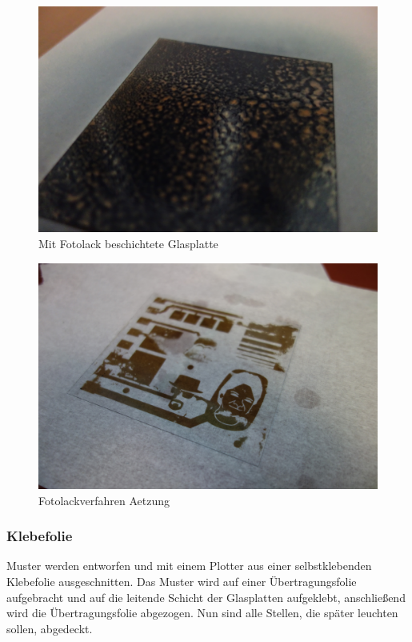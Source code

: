 \begin{figure}[t]
  \centering
  \includegraphics[width=\linewidth, keepaspectratio]{Bilder/Fotolackverfahrenbeschichtet}
  \caption{Mit Fotolack beschichtete Glasplatte}
  \label{Fotolackbeschichtete Glasplatte}
\end{figure}

\begin{figure}[t]
  \centering
  \includegraphics[width=\linewidth, keepaspectratio]{Bilder/Fotolackverfahrengeaetzt}
  \caption{Fotolackverfahren Aetzung}
  \label{Fotolackverfahren Aetzung}
\end{figure}

\subsubsection*{Klebefolie}\label{subsec:klebefolie}
Muster werden entworfen und mit einem Plotter aus einer selbstklebenden Klebefolie ausgeschnitten. Das Muster wird auf einer Übertragungsfolie aufgebracht und auf die leitende Schicht der Glasplatten aufgeklebt, anschließend wird die Übertragungsfolie abgezogen. Nun sind alle Stellen, die später leuchten sollen, abgedeckt.
